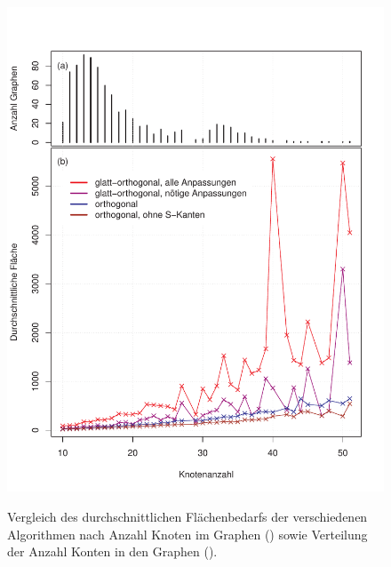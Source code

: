 \documentclass[a4paper]{scrreprt}
\theoremstyle{definition}
\begin{document}
\begin{figure}[p]
  \centering
  {\includegraphics[width=\textwidth]{area_comparison} \label{fig:graphSizes} \label{fig:areaComparison}}
  \caption{Vergleich des durchschnittlichen Flächenbedarfs der verschiedenen Algorithmen nach Anzahl Knoten im Graphen () sowie  Verteilung der Anzahl Konten in den Graphen ().}
  \label{fig:areaComparisonAndGraphSizes}
\end{figure}
\end{document}
